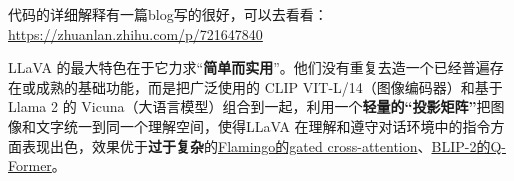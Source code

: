 \documentclass[zihao=false,fontset=windows]{ctexart}
\begin{document}
代码的详细解释有一篇blog写的很好，可以去看看：\url{https://zhuanlan.zhihu.com/p/721647840}\par

\par\vspace{1.15em}\par\vspace{0.28em}

LLaVA 的最大特色在于它力求“\textbf{简单而实用}”。他们没有重复去造一个已经普遍存在或成熟的基础功能，而是把广泛使用的 CLIP VIT-L/14（图像编码器）和基于 Llama 2 的 Vicuna（大语言模型）组合到一起，利用一个\textcolor{feishuRed}{\textbf{轻量的“投影矩阵”}}把图像和文字统一到同一个理解空间，使得LLaVA 在理解和遵守对话环境中的指令方面表现出色，效果优于\textbf{过于复杂}的\href{https://scnajei2ds6y.feishu.cn/wiki/Cb61wEeXDi5NQSkARrbcu8PynEf\#V3VvdDiTuoIVyixgRcNcClO2nhc}{Flamingo的gated cross-attention}、\href{https://scnajei2ds6y.feishu.cn/wiki/AZiVwFmXEirI77kAVzYcOMNVnbh\#NAZtdozkGoFqMQxHJgKc9rCynbe}{BLIP-2的Q-Former}。\par
\end{document}
